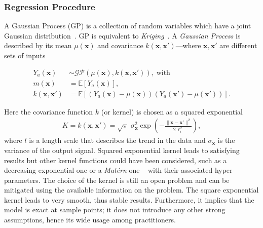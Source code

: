 \subsubsection{Regression Procedure}\label{sec:regression}


A Gaussian Process (GP) is a collection of random variables which have a joint Gaussian distribution~\cite{rasmussen2006}. GP is equivalent to \textit{Kriging}~\cite{krige1989}. A \textit{Gaussian Process} is described by its mean $\mu(\mathbf{x})$ and covariance $k(\mathbf{x},\mathbf{x}')$---where $\mathbf{x}, \mathbf{x}'$ are different sets of inputs

\begin{align}
Y_a(\mathbf{x})&\sim \mathcal{GP}(\mu(\mathbf{x}), k(\mathbf{x},\mathbf{x}')), \;\text{with} \\
m(\mathbf{x}) &= \mathbb{E}\left[ Y_a(\mathbf{x})  \right], \nonumber \\
k(\mathbf{x},\mathbf{x}') &= \mathbb{E}\left[ (Y_a(\mathbf{x}) -\mu(\mathbf{x}))(Y_a(\mathbf{x}')-\mu(\mathbf{x}')) \right] \nonumber.
\end{align}

Here the covariance function $k$ (or kernel) is chosen as a squared exponential
\begin{align} 
K = k(\mathbf{x}, \mathbf{x}') = \sqrt{\pi} \; \sigma_\mathbf{x}^2 \exp\left(-\frac{\|\mathbf{x} - \mathbf{x}'\|^2}{2\,\ell_i^2}\right), 
\end{align}
where $l$ is a length scale that describes the trend in the data and $\sigma_\mathbf{x}$ is the variance of the output signal. Squared exponential kernel leads to satisfying results but other kernel functions could have been considered, such as a decreasing exponential one or a \emph{Matérn} one -- with their associated hyper-parameters. The choice of the kernel is still an open problem and can be mitigated using the available information on the problem. The square exponential kernel leads to very smooth, thus stable results. Furthermore, it implies that the model is exact at sample points; it does not introduce any other strong assumptions, hence its wide usage among practitioners.

